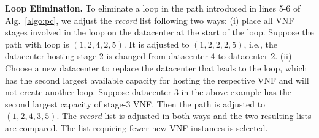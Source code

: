 \noindent \textbf{Loop Elimination.}
To eliminate a loop in the path introduced in lines 5-6 of Alg.~\ref{algo:pc}, we adjust the {\em record} list following two ways: (i) place all VNF stages involved in the loop on the datacenter at the start of the loop. Suppose the path with loop is $(1, 2, 4, 2, 5)$. It is adjusted to $(1, 2, 2, 2, 5)$, i.e., the datacenter hosting stage $2$ is changed from datacenter $4$ to datacenter $2$. %
(ii) Choose a new datacenter to replace the datacenter that leads to the loop, which has the second largest available capacity for hosting the respective VNF and will not create another loop. Suppose datacenter $3$ in the above example has the second largest capacity of stage-$3$ VNF. Then the path is adjusted to %
 $(1, 2, 4, 3, 5)$. The {\em record} list is adjusted in both ways and the two resulting lists are compared. The list requiring fewer new VNF instances is selected.

